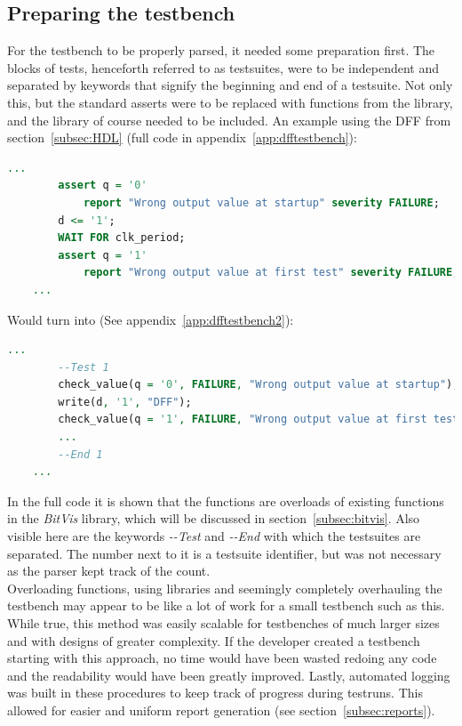 \documentclass[11pt,british]{article}
\begin{document}
\subsection{Preparing the testbench}
\label{subsec:preparing}
For the testbench to be properly parsed, it needed some preparation first. The blocks of tests, henceforth referred to as testsuites, were to be independent and separated by keywords that signify the beginning and end of a testsuite. Not only this, but the standard asserts were to be replaced with functions from the library, and the library of course needed to be included. An example using the \gls{DFF} from section~\ref{subsec:HDL} (full code in appendix~\ref{app:dfftestbench}):
\begin{lstlisting}[language=VHDL, tabsize=4, frame=single, framesep=2mm, belowskip=8pt, aboveskip=8pt, showstringspaces=false, basicstyle=\footnotesize]
	...
		assert q = '0'
			report "Wrong output value at startup" severity FAILURE;
		d <= '1';
     	WAIT FOR clk_period;
     	assert q = '1'
			report "Wrong output value at first test" severity FAILURE;
	...
\end{lstlisting}
Would turn into (See appendix~\ref{app:dfftestbench2}):
\begin{lstlisting}[language=VHDL, tabsize=4, frame=single, framesep=2mm, belowskip=8pt, aboveskip=8pt, showstringspaces=false, basicstyle=\footnotesize]
	...
		--Test 1
		check_value(q = '0', FAILURE, "Wrong output value at startup");
		write(d, '1', "DFF");
		check_value(q = '1', FAILURE, "Wrong output value at first test");
		...
		--End 1
	...
\end{lstlisting}
In the full code it is shown that the functions are overloads of existing functions in the \emph{BitVis} library, which will be discussed in section~\ref{subsec:bitvis}. Also visible here are the keywords \emph{-\--Test} and \emph{-\--End} with which the testsuites are separated. The number next to it is a testsuite identifier, but was not necessary as the parser kept track of the count.
\\[\baselineskip]
Overloading functions, using libraries and seemingly completely overhauling the testbench may appear to be like a lot of work for a small testbench such as this. While true, this method was easily scalable for testbenches of much larger sizes and with designs of greater complexity. If the developer created a testbench starting with this approach, no time would have been wasted redoing any code and the readability would have been greatly improved. Lastly, automated logging was built in these procedures to keep track of progress during testruns. This allowed for easier and uniform report generation (see section~\ref{subsec:reports}).
\end{document}
